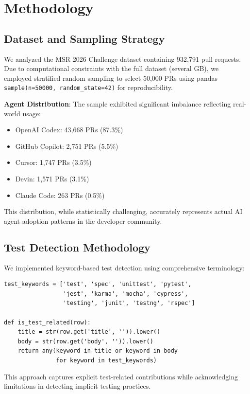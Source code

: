\documentclass[conference]{IEEEtran}
\begin{document}
\section{Methodology}

\subsection{Dataset and Sampling Strategy}

We analyzed the MSR 2026 Challenge dataset containing 932,791 pull requests. Due to computational constraints with the full dataset (several GB), we employed stratified random sampling to select 50,000 PRs using pandas \texttt{sample(n=50000, random\_state=42)} for reproducibility.

\textbf{Agent Distribution}: The sample exhibited significant imbalance reflecting real-world usage:
\begin{itemize}
    \item OpenAI Codex: 43,668 PRs (87.3\%)
    \item GitHub Copilot: 2,751 PRs (5.5\%)
    \item Cursor: 1,747 PRs (3.5\%)
    \item Devin: 1,571 PRs (3.1\%)
    \item Claude Code: 263 PRs (0.5\%)
\end{itemize}

This distribution, while statistically challenging, accurately represents actual AI agent adoption patterns in the developer community.

\subsection{Test Detection Methodology}

We implemented keyword-based test detection using comprehensive terminology:

\begin{verbatim}
test_keywords = ['test', 'spec', 'unittest', 'pytest', 
                 'jest', 'karma', 'mocha', 'cypress', 
                 'testing', 'junit', 'testng', 'rspec']

def is_test_related(row):
    title = str(row.get('title', '')).lower()
    body = str(row.get('body', '')).lower()
    return any(keyword in title or keyword in body 
               for keyword in test_keywords)
\end{verbatim}

This approach captures explicit test-related contributions while acknowledging limitations in detecting implicit testing practices.
\end{document}
